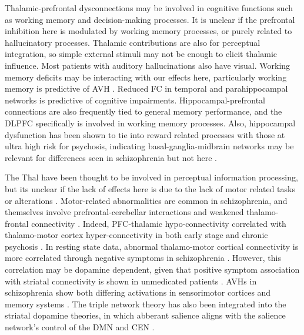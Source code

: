 \documentclass{article}
\begin{document}
Thalamic-prefrontal dysconnections may be involved in cognitive functions such as working memory and decision-making processes. It is unclear if the prefrontal inhibition here is modulated by working memory processes, or purely related to hallucinatory processes. Thalamic contributions are also for perceptual integration, so simple external stimuli may not be enough to elicit thalamic influence. Most patients with auditory hallucinations also have visual. Working memory deficits may be interacting with our effects here, particularly working memory is predictive of AVH \citep{jenkins_working_2018}. Reduced FC in temporal and parahippocampal networks is predictive of cognitive impairments\citep{zhao_cross-cohort_2024}. Hippocampal-prefrontal connections are also frequently tied to general memory performance, and the DLPFC specifically is involved in working memory processes. Also, hippocampal dysfunction has been shown to tie into reward related processes with those at ultra high risk for psychosis, indicating basal-ganglia-midbrain networks may be relevant for differences seen in schizophrenia but not here \citep{winton-brown_altered_2017}. 

The Thal have been thought to be involved in perceptual information processing, but its unclear if the lack of effects here is due to the lack of motor related tasks or alterations \citep{walther_psychomotor_2015}. Motor-related abnormalities are common in schizophrenia, and themselves involve  prefrontal-cerebellar interactions  \citep{walther_psychomotor_2015} and weakened thalamo-frontal connectivity \citep{cheng_voxel-based_2015}. Indeed, PFC-thalamic hypo-connectivity correlated with thalamo-motor cortex hyper-connectivity in both early stage and chronic psychosis \citep{woodward_mapping_2016}. In resting state data, abnormal thalamo-motor cortical connectivity is more correlated through negative symptoms in schizophrenia \citep{martino_abnormal_2018}. However, this correlation may be dopamine dependent, given that positive symptom association with striatal connectivity is shown in unmedicated patients \citep{horga_dopamine-related_2016}. AVHs in schizophrenia show both differing activations in sensorimotor cortices and memory systems \citep{jardri_cortical_2011}. The triple network theory has also been integrated into the striatal dopamine theories, in which abberant salience aligns with the salience network's control of the DMN and CEN \citep{menon_integrative_2023}. 
\end{document}
